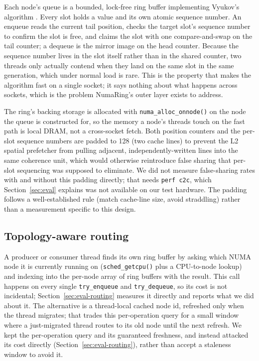 \documentclass[10pt,journal,compsoc]{IEEEtran}
\begin{document}
Each node's queue is a bounded, lock-free ring buffer implementing Vyukov's algorithm
\cite{vyukov_bounded_mpmc}. Every slot holds a value and its own atomic sequence number. An
enqueue reads the current tail position, checks the target slot's sequence number to confirm the
slot is free, and claims the slot with one compare-and-swap on the tail counter; a dequeue is the
mirror image on the head counter. Because the sequence number lives in the slot itself rather than
in the shared counter, two threads only actually contend when they land on the same slot in the
same generation, which under normal load is rare. This is the property that makes the algorithm
fast on a single socket; it says nothing about what happens across sockets, which is the problem
NumaRing's outer layer exists to address.

The ring's backing storage is allocated with \texttt{numa\_alloc\_onnode()} on the node the queue
is constructed for, so the memory a node's threads touch on the fast path is local DRAM, not a
cross-socket fetch. Both position counters and the per-slot sequence numbers are padded to
\SI{128}{\byte} (two cache lines) to prevent the L2 spatial prefetcher from pulling adjacent,
independently-written lines into the same coherence unit, which would otherwise reintroduce false
sharing that per-slot sequencing was supposed to eliminate. We did not measure false-sharing rates
with and without this padding directly; that needs \texttt{perf c2c}, which Section~\ref{sec:eval}
explains was not available on our test hardware. The padding follows a well-established rule
(match cache-line size, avoid straddling) rather than a measurement specific to this design.

\subsection{Topology-aware routing}
\label{sec:topology}

A producer or consumer thread finds its own ring buffer by asking which NUMA node it is currently
running on (\texttt{sched\_getcpu()} plus a CPU-to-node lookup) and indexing into the per-node
array of ring buffers with the result. This call happens on every single \texttt{try\_enqueue} and
\texttt{try\_dequeue}, so its cost is not incidental; Section~\ref{sec:eval-routing} measures it
directly and reports what we did about it. The alternative is a thread-local cached node id,
refreshed only when the thread migrates; that trades this per-operation query for a small window
where a just-migrated thread routes to its old node until the next refresh. We kept the
per-operation query and its guaranteed freshness, and instead attacked its cost directly
(Section~\ref{sec:eval-routing}), rather than accept a staleness window to avoid it.
\end{document}
